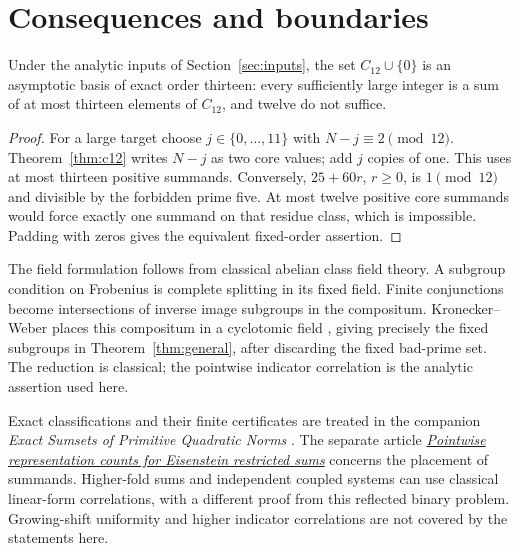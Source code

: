 \section{Consequences and boundaries}
\begin{corollary}\label{cor:basis13}
Under the analytic inputs of Section~\ref{sec:inputs}, the set
\(C_{12}\cup\{0\}\) is an asymptotic basis of exact order
thirteen: every sufficiently large integer is a sum of at most
thirteen elements of \(C_{12}\), and twelve do not suffice.
\end{corollary}
\begin{proof}
For a large target choose \(j\in\{0,\ldots,11\}\) with
\(N-j\equiv2\pmod{12}\). Theorem~\ref{thm:c12} writes \(N-j\)
as two core values; add \(j\) copies of one. This uses at most thirteen
positive summands. Conversely, \(25+60r\), \(r\ge0\), is
\(1\pmod{12}\) and divisible by the forbidden prime five.
At most twelve positive core summands would force exactly one
summand on that residue class, which is impossible. Padding with
zeros gives the equivalent fixed-order assertion.
\end{proof}

The field formulation follows from classical abelian class field
theory. A subgroup condition on Frobenius is complete splitting in
its fixed field. Finite conjunctions become intersections of inverse
image subgroups in the compositum. Kronecker--Weber places this
compositum in a cyclotomic field
\cite[Chapter I, Theorem 4.16]{milnecft}, giving precisely the
fixed subgroups in Theorem~\ref{thm:general}, after discarding the
fixed bad-prime set. The reduction is classical; the pointwise
indicator correlation is the analytic assertion used here.

Exact classifications and their finite certificates are treated in
the companion \emph{Exact Sumsets of Primitive Quadratic Norms}
\cite{exactcompanion}.
The separate article
\href{https://hexagonmath.org/2611.00593v1}{\emph{Pointwise representation
counts for Eisenstein restricted sums}} concerns the placement of summands.
Higher-fold sums and independent coupled systems can use classical
linear-form correlations, with a different proof from this reflected
binary problem. Growing-shift uniformity and higher indicator correlations
are not covered by the statements here.
